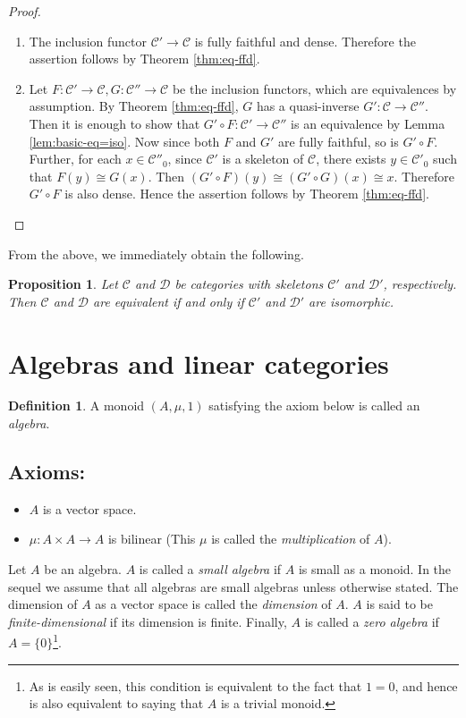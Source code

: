 \documentclass{surv-l}
\numberwithin{equation}{chapter}
\numberwithin{figure}{chapter}
\theoremstyle{plain}
\newtheorem{prp}[thm]{Proposition}
\theoremstyle{definition}
\newtheorem{dfn}[thm]{Definition}
\theoremstyle{remark}
\begin{document}
\begin{proof}\leavevmode
\begin{enumerate}[wide]
\item The inclusion functor ${\mathcal{C}}' \to {\mathcal{C}}$ is fully faithful and dense.
Therefore the assertion follows by Theorem \ref{thm:eq-ffd}.
\item Let $F \colon {\mathcal{C}}' \to {\mathcal{C}}, G \colon {\mathcal{C}}'' \to {\mathcal{C}}$ be
the inclusion functors,
which are equivalences by assumption.
By Theorem \ref{thm:eq-ffd}, $G$ has a quasi-inverse $G' \colon {\mathcal{C}} \to {\mathcal{C}}''$.
Then it is enough to show that
$G' \circ F \colon {\mathcal{C}}' \to {\mathcal{C}}''$ is an equivalence
by Lemma \ref{lem:basic-eq=iso}.
Now since both $F$ and $G'$ are fully faithful,
so is $G' \circ F$.
Further, for each $x \in {\mathcal{C}}''_0$, since ${\mathcal{C}}'$ is a skeleton of ${\mathcal{C}}$,
there exists $y \in {\mathcal{C}}'_0$ such that $F(y) \cong G(x)$.
Then $(G'\circ F)(y) \cong (G' \circ G)(x) \cong x$.
Therefore $G' \circ F$ is also dense.
Hence the assertion follows by Theorem \ref{thm:eq-ffd}.
\end{enumerate}
\end{proof}

From the above, we immediately obtain the following.

\begin{prp}
Let ${\mathcal{C}}$ and ${\mathcal{D}}$ be categories with skeletons ${\mathcal{C}}'$ and ${\mathcal{D}}'$,
respectively.
Then ${\mathcal{C}}$ and ${\mathcal{D}}$ are equivalent if and only if
${\mathcal{C}}'$ and ${\mathcal{D}}'$ are isomorphic.
\end{prp}

\section{Algebras and linear categories}\begin{dfn}
A monoid $(A, \mu, 1)$ satisfying the axiom below is called an
\emph{algebra}.

\subsection*{Axioms:}
\begin{itemize}
\item
$A$ is a vector space.
\item
$\mu \colon A \times A \to A$ is bilinear
(This $\mu$ is called the \emph{multiplication} of $A$).
\end{itemize}
Let $A$ be an algebra.
$A$ is called a \emph{small algebra} if $A$ is small as a monoid.
In the sequel we assume that all algebras are small algebras unless otherwise stated.
The dimension of $A$ as a vector space is called the {\em dimension} of $A$.
$A$ is said to be {\em finite-dimensional} if its dimension is finite.
Finally, $A$ is called a \emph{zero algebra} if $A = \{0\}$\footnote{As is easily seen, this condition is equivalent to the fact that $1 = 0$, and hence is also equivalent to
saying that $A$ is a trivial monoid.}.
\end{dfn}
\end{document}
